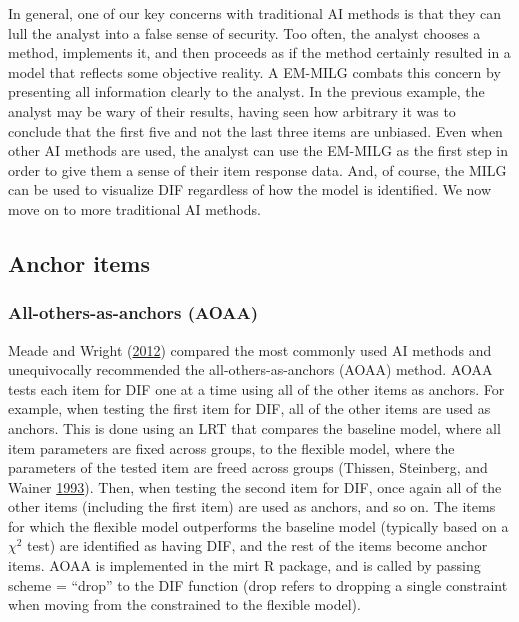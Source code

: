 \documentclass[
  11pt,
]{article}
\begin{document}
In general, one of our key concerns with traditional AI methods is that they can lull the analyst into a false sense of security. Too often, the analyst chooses a method, implements it, and then proceeds as if the method certainly resulted in a model that reflects some objective reality. A EM-MILG combats this concern by presenting all information clearly to the analyst. In the previous example, the analyst may be wary of their results, having seen how arbitrary it was to conclude that the first five and not the last three items are unbiased. Even when other AI methods are used, the analyst can use the EM-MILG as the first step in order to give them a sense of their item response data. And, of course, the MILG can be used to visualize DIF regardless of how the model is identified. We now move on to more traditional AI methods.

\hypertarget{anchoritems}{%
\subsection{Anchor items}\label{anchoritems}}

\hypertarget{all-others-as-anchors-aoaa}{%
\subsubsection{All-others-as-anchors (AOAA)}\label{all-others-as-anchors-aoaa}}

Meade and Wright (\protect\hyperlink{ref-meade2012solving}{2012}) compared the most commonly used AI methods and unequivocally recommended the all-others-as-anchors (AOAA) method. AOAA tests each item for DIF one at a time using all of the other items as anchors. For example, when testing the first item for DIF, all of the other items are used as anchors. This is done using an LRT that compares the baseline model, where all item parameters are fixed across groups, to the flexible model, where the parameters of the tested item are freed across groups (Thissen, Steinberg, and Wainer \protect\hyperlink{ref-thissen1993detection}{1993}). Then, when testing the second item for DIF, once again all of the other items (including the first item) are used as anchors, and so on. The items for which the flexible model outperforms the baseline model (typically based on a \(\chi^2\) test) are identified as having DIF, and the rest of the items become anchor items. AOAA is implemented in the mirt R package, and is called by passing scheme = \enquote{drop} to the DIF function (drop refers to dropping a single constraint when moving from the constrained to the flexible model).
\end{document}
